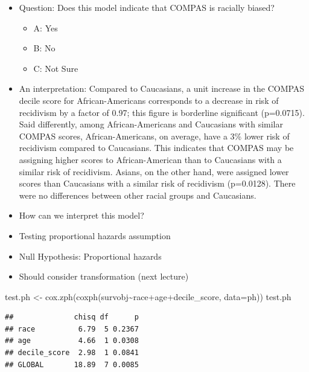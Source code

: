 \documentclass[
]{article}
\newenvironment{Shaded}{\begin{snugshade}}{\end{snugshade}}
\newcommand{\AttributeTok}[1]{\textcolor[rgb]{0.77,0.63,0.00}{#1}}
\newcommand{\FunctionTok}[1]{\textcolor[rgb]{0.00,0.00,0.00}{#1}}
\newcommand{\NormalTok}[1]{#1}
\newcommand{\OtherTok}[1]{\textcolor[rgb]{0.56,0.35,0.01}{#1}}
\newcommand{\SpecialCharTok}[1]{\textcolor[rgb]{0.00,0.00,0.00}{#1}}
\providecommand{\tightlist}{%
  \setlength{\itemsep}{0pt}\setlength{\parskip}{0pt}}
\begin{document}
\begin{itemize}
\item
  Question: Does this model indicate that COMPAS is racially biased?

  \begin{itemize}
  \tightlist
  \item
    A: Yes
  \item
    B: No
  \item
    C: Not Sure
  \end{itemize}
\item
  An interpretation: Compared to Caucasians, a unit increase in the
  COMPAS decile score for African-Americans corresponds to a decrease in
  risk of recidivism by a factor of 0.97; this figure is borderline
  significant (p=0.0715). Said differently, among African-Americans and
  Caucasians with similar COMPAS scores, African-Americans, on average,
  have a 3\% lower risk of recidivism compared to Caucasians. This
  indicates that COMPAS may be assigning higher scores to
  African-American than to Caucasians with a similar risk of recidivism.
  Asians, on the other hand, were assigned lower scores than Caucasians
  with a similar risk of recidivism (p=0.0128). There were no
  differences between other racial groups and Caucasians.
\item
  How can we interpret this model?
\item
  Testing proportional hazards assumption
\item
  Null Hypothesis: Proportional hazards
\item
  Should consider transformation (next lecture)
\end{itemize}

\begin{Shaded}
\begin{Highlighting}[]
\NormalTok{test.ph }\OtherTok{\textless{}{-}} \FunctionTok{cox.zph}\NormalTok{(}\FunctionTok{coxph}\NormalTok{(survobj}\SpecialCharTok{\textasciitilde{}}\NormalTok{race}\SpecialCharTok{+}\NormalTok{age}\SpecialCharTok{+}\NormalTok{decile\_score, }\AttributeTok{data=}\NormalTok{ph))}
\NormalTok{test.ph}
\end{Highlighting}
\end{Shaded}

\begin{verbatim}
##              chisq df      p
## race          6.79  5 0.2367
## age           4.66  1 0.0308
## decile_score  2.98  1 0.0841
## GLOBAL       18.89  7 0.0085
\end{verbatim}
\end{document}
